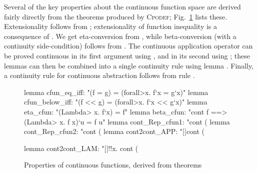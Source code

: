 Several of the key properties about the continuous function space are derived fairly directly from the theorems produced by \textsc{Cpodef}; Fig.~\ref{fig:holcf-cfun-rules} lists these. Extensionality follows from ; extensionality of function inequality is a consequence of . We get eta-conversion from , while beta-conversion (with a continuity side-condition) follows from . The continuous application operator  can be proved continuous in its first argument using , and in its second using ; these lemmas can then be combined into a single continuity rule using lemma . Finally, a continuity rule for continuous abstraction follows from rule .

\begin{figure}
\begin{isabelle}
lemma cfun_eq_iff: "(f = g) = (\<forall>x. f`x = g`x)"
lemma cfun_below_iff: "(f << g) = (\<forall>x. f`x << g`x)"
lemma eta_cfun: "(\<Lambda> x. f`x) = f"
lemma beta_cfun: "cont f ==> (\<Lambda> x. f x)`u = f u"
lemma cont_Rep_cfun1: "cont (%
lemma cont_Rep_cfun2: "cont (%
lemma cont2cont_APP: "[|cont (%
\end{isabelle}
\vspace{-2.5\medskipamount}
\begin{isacode}
lemma cont2cont_LAM:
  "[|!!x. cont (%
\end{isacode}
\caption{Properties of continuous functions, derived from  theorems}
\label{fig:holcf-cfun-rules}
\end{figure}

